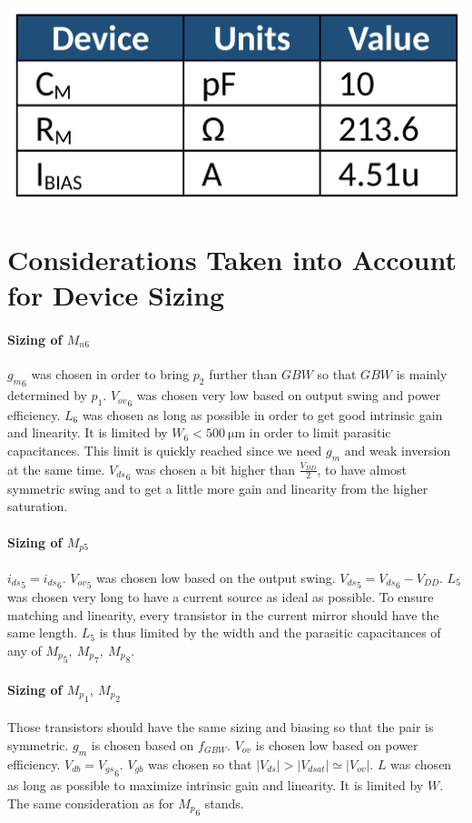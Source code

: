 \documentclass[english,10pt]{article}
\begin{document}
\begin{center}
\includegraphics[width = .3\textwidth]{page2_table1.png}
\end{center}
\setcounter{section}{4}
\setcounter{page}{2}
\section{Considerations Taken into Account for Device Sizing}

\paragraph{Sizing of $M_{n6}$}
${g_m}_{6}$ was chosen in order to bring $p_{2}$ further than $GBW$ so that $GBW$ is mainly determined by $p_1$.
${V_{ov}}_{6}$ was chosen very low based on output swing and power efficiency.
$L_{6}$ was chosen as long as possible in order to get good intrinsic gain and linearity. It is limited by $W_{6} < \SI{500}{\micro\meter}$ in order to limit parasitic capacitances. This limit is quickly reached since we need $g_m$ and weak inversion at the same time.
${V_{ds}}_6$ was chosen a bit higher than $\frac{V_{DD}}{2}$, to have almost symmetric swing and to get a little more gain and linearity from the higher saturation.

\paragraph{Sizing of $M_{p5}$}
${i_{ds}}_5 = {i_{ds}}_6$.
${V_{ov}}_5$ was chosen low based on the output swing.
${V_{ds}}_5 = {V_{ds}}_6 - V_{DD}$.
$L_{5}$ was chosen very long to have a current source as ideal as possible. To ensure matching and linearity, every transistor in the current mirror should have the same length. $L_{5}$ is thus limited by the width and the parasitic capacitances of any of ${M_p}_{5}, \: {M_p}_{7}, \: {M_p}_{8}$.

\paragraph{Sizing of ${M_p}_{1},\:{M_p}_2$}
Those transistors should have the same sizing and biasing so that the pair is symmetric.
${g_m}$ is chosen based on $f_{GBW}$.
$V_{ov}$ is chosen low based on power efficiency.
${V_{db}} = {V_{gs}}_6$.
$V_{gb}$ was chosen so that $|V_{ds}| > |V_{dsat}| \simeq |V_{ov}|$.
$L$ was chosen as long as possible to maximize intrinsic gain and linearity. It is limited by $W$. The same consideration as for ${M_p}_6$ stands.
\end{document}
